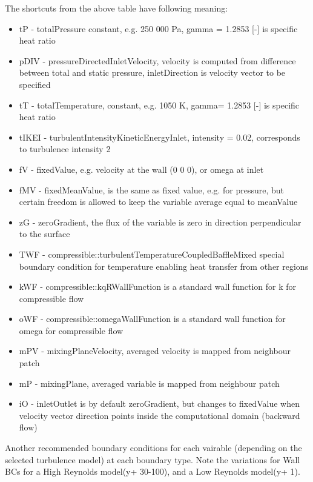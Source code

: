 \documentclass{article}
\begin{document}
The shortcuts from the above table have following meaning:
\begin{itemize}
    \item tP - totalPressure constant, e.g. 250 000 Pa, gamma = 1.2853 [-] is specific heat ratio
    \item pDIV - pressureDirectedInletVelocity, velocity is computed from difference between total and static pressure, inletDirection is velocity vector to be specified
    \item tT - totalTemperature, constant, e.g. 1050 K, gamma= 1.2853 [-] is specific heat ratio
    \item tIKEI - turbulentIntensityKineticEnergyInlet, intensity = 0.02, corresponds to turbulence intensity 2%
    \item fV - fixedValue, e.g. velocity at the wall (0 0 0), or omega at inlet
    \item fMV - fixedMeanValue, is the same as fixed value, e.g. for pressure, but certain freedom is allowed to keep the variable average equal to meanValue
    \item zG - zeroGradient, the flux of the variable is zero in direction perpendicular to the surface
    \item TWF - compressible::turbulentTemperatureCoupledBaffleMixed special boundary condition for temperature enabling heat transfer from other regions
    \item kWF - compressible::kqRWallFunction is a standard wall function for k for compressible flow
    \item oWF - compressible::omegaWallFunction is a standard wall function for omega for compressible flow
    \item mPV - mixingPlaneVelocity, averaged velocity is mapped from neighbour patch
    \item mP - mixingPlane, averaged variable is mapped from neighbour patch
    \item iO - inletOutlet is by default zeroGradient, but changes to fixedValue when velocity vector direction points inside the computational domain (backward flow)
\end{itemize}


Another recommended boundary conditions for each vairable (depending on the selected turbulence model) at each boundary type. Note the variations for Wall BCs for a High Reynolds model(y+ 30-100), and a Low Reynolds model(y+ 1).
\end{document}
